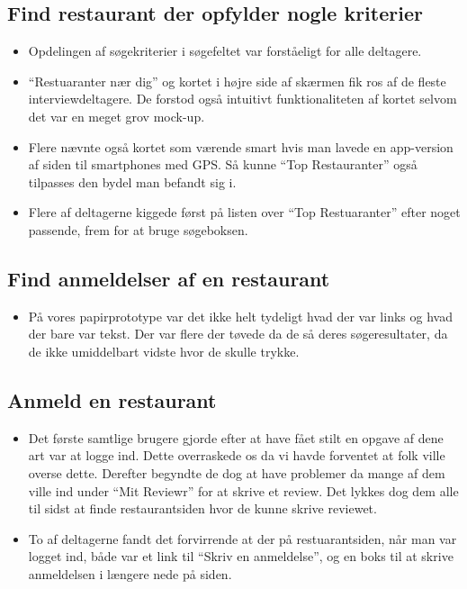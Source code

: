 \documentclass[a4paper, 12pt]{article}
\newcommand\pic[1]{\texttt{[image: ../oevelse6/Pics/\#1]}}
\newcommand\goodidea{\pic{goodidea}}
\newcommand\good{\pic{good}}
\newcommand\smallprob{\pic{smallproblem}}
\begin{document}
\subsection{Find restaurant der opfylder nogle kriterier}
\begin{itemize}
\item[\good] Opdelingen af søgekriterier i søgefeltet var forståeligt for alle deltagere.
\item[\good] ``Restuaranter nær dig'' og kortet i højre side af skærmen fik ros af de fleste interviewdeltagere. De forstod også intuitivt funktionaliteten af kortet selvom det var en meget grov mock-up.
\item[\goodidea] Flere nævnte også kortet som værende smart hvis man lavede en app-version af siden til smartphones med GPS. Så kunne ``Top Restauranter'' også tilpasses den bydel man befandt sig i.
\item[\smallprob] Flere af deltagerne kiggede først på listen over ``Top Restuaranter'' efter noget passende, frem for at bruge søgeboksen.
\end{itemize}

\subsection{Find anmeldelser af en restaurant}
\begin{itemize}
\item[\smallprob] På vores papirprototype var det ikke helt tydeligt hvad der var links og hvad der bare var tekst. Der var flere der tøvede da de så deres søgeresultater, da de ikke umiddelbart vidste hvor de skulle trykke.
\end{itemize}

\subsection{Anmeld en restaurant}
\begin{itemize}
\item[\smallprob] Det første samtlige brugere gjorde efter at have fået stilt en opgave af dene art
var at logge ind. Dette overraskede os da vi havde forventet at folk ville overse dette. Derefter begyndte de dog at have problemer da mange af dem ville ind under
``Mit Reviewr'' for at skrive et review. Det lykkes dog dem alle til sidst at finde
restaurantsiden hvor de kunne skrive reviewet.
\item[\smallprob] To af deltagerne fandt det forvirrende at der på restuarantsiden, når man var logget ind, både var et link til ``Skriv en anmeldelse'', og en boks til at skrive anmeldelsen i længere nede på siden.  
\end{itemize}
\end{document}
